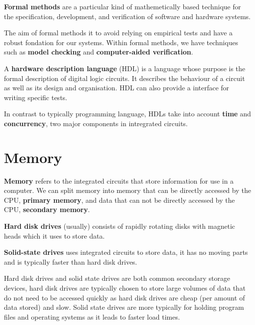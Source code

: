 \begin{definition}
    \textbf{Formal methods} are a particular kind of mathemetically based technique for the specification, development, and verification of software and hardware systems. 
\end{definition}

The aim of formal methods it to avoid relying on empirical tests and have a robust fondation for our systems. Within formal methods, we have techniques such as \textbf{model checking} and \textbf{computer-aided verification}. 

\begin{definition}
    A \textbf{hardware description language} (HDL) is a language whose purpose is the formal description of digital logic circuits. It describes the behaviour of a circuit as well as its design and organisation. HDL can also provide a interface for writing specific tests.
\end{definition}

In contrast to typically programming language, HDLs take into account \textbf{time} and \textbf{concurrency}, two major components in intregrated circuits. 

\section{Memory}

\begin{definition}[Memory]
    \textbf{Memory} refers to the integrated circuits that store information for use in a computer. We can split memory into memory that can be directly accessed by the CPU, \textbf{primary memory}, and data that can not be directly accessed by the CPU, \textbf{secondary memory}.
\end{definition}

\begin{definition}
    \textbf{Hard disk drives} (usually) consists of rapidly rotating disks with magnetic heads which it uses to store data. 
\end{definition}

\begin{definition}
    \textbf{Solid-state drives} uses integrated circuits to store data, it has no moving parts and is typically faster than hard disk drives. 
\end{definition}

Hard disk drives and solid state drives are both common secondary storage devices, hard disk drives are typically chosen to store large volumes of data that do not need to be accessed quickly as hard disk drives are cheap (per amount of data stored) and slow. Solid state drives are more typically for holding program files and operating systems as it leads to faster load times. 


